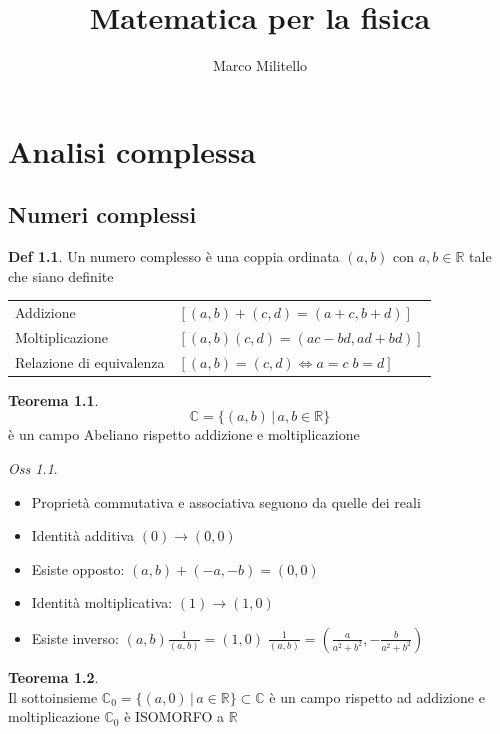 \documentclass[a4paper,11pt]{report}
\theoremstyle{remark}
\newtheorem*{oss}{Oss}
\theoremstyle{definition}
\newtheorem*{teo}{Teorema}
\newtheorem*{Def}{Def}
\newcommand{\C}{\mathbb{C}}
\newcommand{\R}{\mathbb{R}}
\begin{document}
	\date{}
	\author{Marco Militello}
	\title{Matematica per la fisica}
	\maketitle
	\tableofcontents
	\newpage
	
\part{Analisi complessa}

\chapter{Numeri complessi}
\begin{Def}
	Un numero complesso è una coppia ordinata $(a,b)$ con $a,b \in \R$ tale che siano definite
	\begin{center}
	\begin{tabular}{ll}
		 Addizione  & $[(a,b)+(c,d) = (a+c, b+d)]$\\
		 Moltiplicazione & $[(a,b)(c,d) = (ac-bd, ad+bd)]$ \\
		 Relazione di equivalenza & $[(a,b) = (c,d) \iff a=c \; b=d]$
	\end{tabular}
 	\end{center}
\end{Def}
\begin{teo}
	\[\C = \{(a,b)\, | \, a,b \in \R\}\]
	è un campo Abeliano rispetto addizione e moltiplicazione
\end{teo}
\begin{oss}\hfil
	\begin{itemize}
		\item Proprietà commutativa e associativa seguono da quelle dei reali
		\item Identità additiva \quad $(0) \rightarrow (0,0)$
		\item Esiste opposto: \quad $(a,b) + (-a,-b) = (0,0)$
		\item Identità moltiplicativa: \quad $(1) \rightarrow (1,0)$
		\item Esiste inverso: \quad $(a,b)\frac{1}{(a,b)}= (1,0) \; \frac{1}{(a,b)} = \left(\frac{a}{a^2+b^2}, -\frac{b}{a^2+b^2}\right)$
	\end{itemize}
\end{oss}
\begin{teo}\hfill\\
	Il sottoinsieme $\C_0 = \{(a,0) \, | \, a \in \R\} \subset \C$ è un campo rispetto ad addizione e moltiplicazione \newline
	$\C_0$ è ISOMORFO a $\R$
\end{teo}
\end{document}
